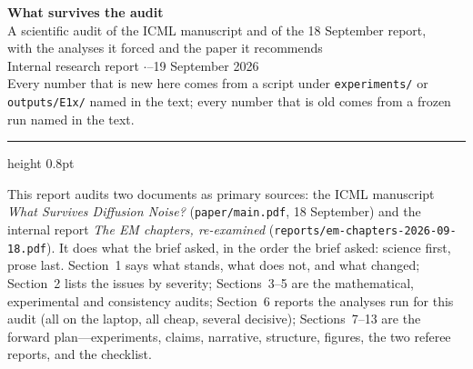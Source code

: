 \documentclass[11pt,a4paper]{article}
\theoremstyle{definition}
\theoremstyle{remark}
\begin{document}
\begin{center}
{\LARGE\bfseries What survives the audit}\\[0.45em]
{\large A scientific audit of the ICML manuscript and of the 18 September report,\\ with the analyses it forced and the paper it recommends}\\[0.9em]
{\small Internal research report \quad$\cdot$--19 September 2026}\\[0.25em]
{\footnotesize Every number that is new here comes from a script under \texttt{experiments/} or \texttt{outputs/E1x/} named in the text; every number that is old comes from a frozen run named in the text.}
\end{center}

\vspace{0.4em}
\hrule height 0.8pt
\vspace{1.2em}

\noindent
This report audits two documents as primary sources: the ICML manuscript \emph{What Survives Diffusion Noise?} (\texttt{paper/main.pdf}, 18 September) and the internal report \emph{The EM chapters, re-examined} (\texttt{reports/em-chapters-2026-09-18.pdf}). It does what the brief asked, in the order the brief asked: science first, prose last. Section~1 says what stands, what does not, and what changed; Section~2 lists the issues by severity; Sections~3--5 are the mathematical, experimental and consistency audits; Section~6 reports the analyses run for this audit (all on the laptop, all cheap, several decisive); Sections~7--13 are the forward plan---experiments, claims, narrative, structure, figures, the two referee reports, and the checklist.
\end{document}
